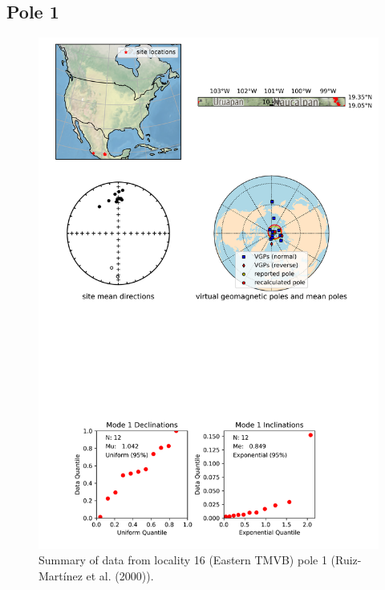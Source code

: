 \documentclass{article}
\begin{document}
\subsection{Pole 1}


\begin{figure}[H]
\centering
\includegraphics[width=5 in]{./16/1/pole_summary.png}
\caption{Summary of data from locality 16 (Eastern TMVB) pole 1 (Ruiz-Martínez et al. (2000)).}
\end{figure}
\end{document}
